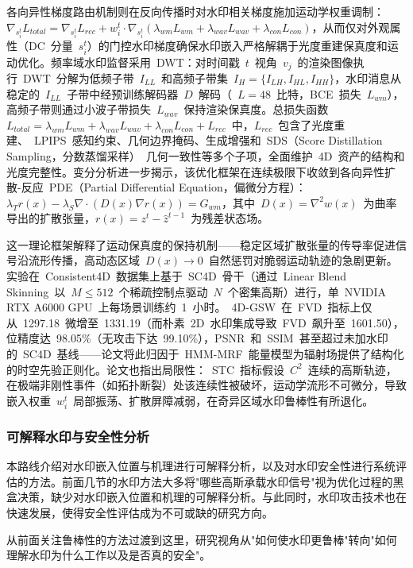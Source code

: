 各向异性梯度路由机制则在反向传播时对水印相关梯度施加运动学权重调制：$\nabla_{s_i^t} L_{total} = \nabla_{s_i^t} L_{rec} + w_i^t \cdot \nabla_{s_i^t} (\lambda_{wm}L_{wm} + \lambda_{wav}L_{wav} + \lambda_{con}L_{con})$，从而仅对外观属性（DC~分量~$s_i^t$）的门控水印梯度确保水印嵌入严格解耦于光度重建保真度和运动优化。频率域水印监督采用~DWT：对时间戳~$t$~视角~$v_j$~的渲染图像执行~DWT~分解为低频子带~$I_{LL}$~和高频子带集~$I_H = \{I_{LH}, I_{HL}, I_{HH}\}$，水印消息从稳定的~$I_{LL}$~子带中经预训练解码器~$D$~解码（~$L=48$~比特，BCE~损失~$L_{wm}$），高频子带则通过小波子带损失~$L_{wav}$~保持渲染保真度。总损失函数~$L_{total} = \lambda_{wm}L_{wm} + \lambda_{wav}L_{wav} + \lambda_{con}L_{con} + L_{rec}$~中，$L_{rec}$~包含了光度重建、~LPIPS~感知约束、几何边界掩码、生成增强和~SDS（Score Distillation Sampling，分数蒸馏采样）~几何一致性等多个子项，全面维护~4D~资产的结构和光度完整性。变分分析进一步揭示，该优化框架在连续极限下收敛到各向异性扩散-反应~PDE（Partial Differential Equation，偏微分方程）：$\lambda_T r(x) - \lambda_S \nabla \cdot (D(x) \nabla r(x)) = G_{wm}$，其中~$D(x) = \nabla^2 w(x)$~为曲率导出的扩散张量，$r(x) = z^t - \hat{z}^{t-1}$~为残差状态场。

这一理论框架解释了运动保真度的保持机制——稳定区域扩散张量的传导率促进信号沿流形传播，高动态区域~$D(x) \to 0$~自然惩罚对脆弱运动轨迹的急剧更新。实验在~Consistent4D~数据集上基于~SC4D~骨干（通过~Linear Blend Skinning~以~$M \leq 512$~个稀疏控制点驱动~$N$~个密集高斯）进行，单~NVIDIA RTX A6000 GPU~上每场景训练约~1~小时。~4D-GSW~在~FVD~指标上仅从~1297.18~微增至~1331.19（而朴素~2D~水印集成导致~FVD~飙升至~1601.50），位精度达~98.05\%（无攻击下达~99.10\%），PSNR~和~SSIM~甚至超过未加水印的~SC4D~基线——论文将此归因于~HMM-MRF~能量模型为辐射场提供了结构化的时空先验正则化。论文也指出局限性：~STC~指标假设~$C^2$~连续的高斯轨迹，在极端非刚性事件（如拓扑断裂）处该连续性被破坏，运动学流形不可微分，导致嵌入权重~$w_i^t$~局部振荡、扩散屏障减弱，在奇异区域水印鲁棒性有所退化。

\subsubsection{可解释水印与安全性分析}

本路线介绍对水印嵌入位置与机理进行可解释分析，以及对水印安全性进行系统评估的方法。前面几节的水印方法大多将"哪些高斯承载水印信号"视为优化过程的黑盒决策，缺少对水印嵌入位置和机理的可解释分析。与此同时，水印攻击技术也在快速发展，使得安全性评估成为不可或缺的研究方向。

从前面关注鲁棒性的方法过渡到这里，研究视角从"如何使水印更鲁棒"转向"如何理解水印为什么工作以及是否真的安全"。

